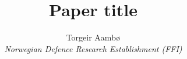 \documentclass[11pt, twocolumn]{article}
\author{Torgeir Aamb\o \\ \textit{Norwegian Defence Research Establishment (FFI)}}
\title{Paper title}
\date{}
\begin{document}
\maketitle 
 






\printbibliography{}  
\end{document}

